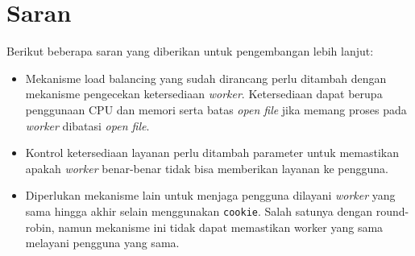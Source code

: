 \documentclass{ta-its}
\begin{document}
			\section{Saran}
				Berikut beberapa saran yang diberikan untuk pengembangan lebih lanjut:
				\begin{itemize}
					\item Mekanisme load balancing yang sudah dirancang perlu ditambah dengan mekanisme pengecekan ketersediaan \textit{worker}. Ketersediaan dapat berupa penggunaan CPU dan memori serta batas \textit{open file} jika memang proses pada \textit{worker} dibatasi \textit{open file}.
					\item Kontrol ketersediaan layanan perlu ditambah parameter untuk memastikan apakah \textit{worker} benar-benar tidak bisa memberikan layanan ke pengguna.
					\item Diperlukan mekanisme lain untuk menjaga pengguna dilayani \textit{worker} yang sama hingga akhir selain menggunakan \texttt{cookie}. Salah satunya dengan round-robin, namun mekanisme ini tidak dapat memastikan worker yang sama melayani pengguna yang sama.
				\end{itemize}
				
\end{document}
